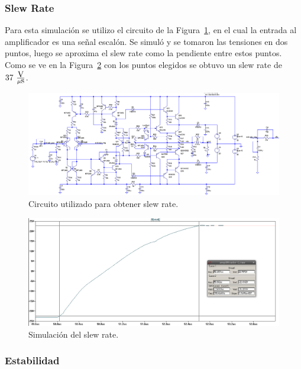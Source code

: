 \bigskip
\subsubsection{Slew Rate}

Para esta simulación se utilizo el circuito de la Figura~\ref{cir_simul_slew_rate}, en el cual la entrada al amplificador es una señal escalón. Se simuló y se tomaron las tensiones en dos puntos, luego se aproxima el slew rate como la pendiente entre estos puntos. Como se ve en la Figura~\ref{simul_slew_rate} con los puntos elegidos se obtuvo un slew rate de $37~ \frac{\mbox{V}}{\mu\mbox{s}}$.

\begin{figure}[H]
\centering
\includegraphics[width=1\textwidth]{img/slew_rate_cir.png}
\caption{Circuito utilizado para obtener slew rate.}
\label{cir_simul_slew_rate}
\end{figure}

\begin{figure}[H]
\centering
\centerline{\includegraphics[width=1\textwidth]{img/slew_rate.png}}
\caption{Simulación del slew rate.}
\label{simul_slew_rate}
\end{figure}

\medskip
\subsubsection{Estabilidad}

